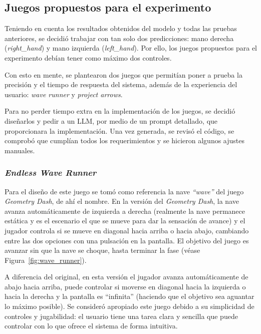 \subsection{Juegos propuestos para el experimento}
\label{subsec:juegos}

Teniendo en cuenta los resultados obtenidos del modelo y todas las pruebas anteriores, se decidió trabajar con tan solo dos predicciones: mano derecha (\textit{right\_hand}) y mano izquierda (\textit{left\_hand}). Por ello, los juegos propuestos para el experimento debían tener como máximo dos controles.

Con esto en mente, se plantearon dos juegos que permitían poner a prueba la precisión y el tiempo de respuesta del sistema, además de la experiencia del usuario: \textit{wave runner} y \textit{project arrows}.

Para no perder tiempo extra en la implementación de los juegos, se decidió diseñarlos y pedir a un LLM, por medio de un prompt detallado, que proporcionara la implementación. Una vez generada, se revisó el código, se comprobó que cumplían todos los requerimientos y se hicieron algunos ajustes manuales.

\subsubsection{\textit{Endless Wave Runner}}
\label{subsubsec:endless_wave_runner}

Para el diseño de este juego se tomó como referencia la nave \textit{``wave''} del juego \textit{Geometry Dash}, de ahí el nombre. En la versión del \textit{Geometry Dash}, la nave avanza automáticamente de izquierda a derecha (realmente la nave permanece estática y es el escenario el que se mueve para dar la sensación de avance) y el jugador controla si se mueve en diagonal hacia arriba o hacia abajo, cambiando entre las dos opciones con una pulsación en la pantalla. El objetivo del juego es avanzar sin que la nave se choque, hasta terminar la fase (véase Figura~\ref{fig:wave_runner}). 

A diferencia del original, en esta versión el jugador avanza automáticamente de abajo hacia arriba, puede controlar si moverse en diagonal hacia la izquierda o hacia la derecha y la pantalla es ``infinita'' (haciendo que el objetivo sea aguantar lo máximo posible). Se consideró apropiado este juego debido a su simplicidad de controles y jugabilidad: el usuario tiene una tarea clara y sencilla que puede controlar con lo que ofrece el sistema de forma intuitiva. 

